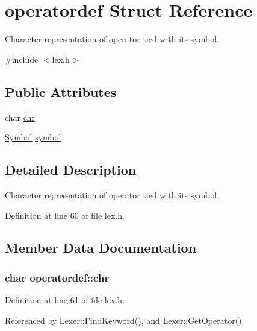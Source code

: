 \hypertarget{structoperatordef}{}\section{operatordef Struct Reference}
\label{structoperatordef}


Character representation of operator tied with its symbol.  




{\ttfamily \#include $<$lex.\+h$>$}

\subsection*{Public Attributes}
\begin{DoxyCompactItemize}
\item 
char \hyperlink{structoperatordef_afe0e7e99e83e532bf9d616ed75a133c6}{chr}
\item 
\hyperlink{lex_8h_a7feef761cd73fac6e25b8bb80d2c4e54}{Symbol} \hyperlink{structoperatordef_a32edc0834e7c84d88c7e94240b922dc1}{symbol}
\end{DoxyCompactItemize}


\subsection{Detailed Description}
Character representation of operator tied with its symbol. 

Definition at line 60 of file lex.\+h.



\subsection{Member Data Documentation}
\subsubsection[{\texorpdfstring{chr}{chr}}]{\setlength{\rightskip}{0pt plus 5cm}char operatordef\+::chr}\hypertarget{structoperatordef_afe0e7e99e83e532bf9d616ed75a133c6}{}\label{structoperatordef_afe0e7e99e83e532bf9d616ed75a133c6}


Definition at line 61 of file lex.\+h.



Referenced by Lexer\+::\+Find\+Keyword(), and Lexer\+::\+Get\+Operator().

